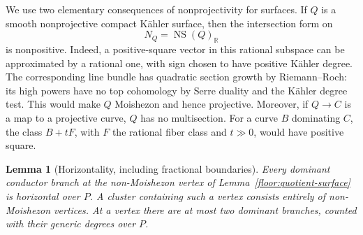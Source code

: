 \documentclass[11pt,letterpaper]{article}
\newcommand{\R}{\mathbb{R}}
\DeclareMathOperator{\NS}{NS}
\newtheorem{lemma}[theorem]{Lemma}
\theoremstyle{definition}
\theoremstyle{remark}
\begin{document}
We use two elementary consequences of nonprojectivity for surfaces.
If $Q$ is a smooth nonprojective compact K\"ahler surface, then the
intersection form on
\[
 N_Q=\NS(Q)_{\R}
\]
is nonpositive.  Indeed, a positive-square vector in this rational
subspace can be approximated by a rational one, with sign chosen to
have positive K\"ahler degree.  The corresponding line bundle has
quadratic section growth by Riemann--Roch: its high powers have no
top cohomology by Serre duality and the K\"ahler degree test.  This
would make $Q$ Moishezon and hence projective.  Moreover, if
$Q\to C$ is a map to a projective curve, $Q$ has no multisection.
For a curve $B$ dominating $C$, the class $B+tF$, with $F$ the
rational fiber class and $t\gg0$, would have positive square.

\begin{lemma}[Horizontality, including fractional boundaries]
\label{floor:horizontality}
Every dominant conductor branch at the non-Moishezon vertex of
Lemma~\ref{floor:quotient-surface} is horizontal over $P$.  A
cluster containing such a vertex consists entirely of
non-Moishezon vertices.  At a vertex there are at most two dominant
branches, counted with their generic degrees over $P$.
\end{lemma}
\end{document}

